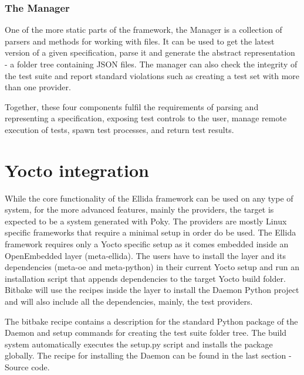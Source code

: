 \subsubsection*{The Manager}
One of the more static parts of the framework, the Manager is a collection of parsers and methods for working with files. It can be used to get the latest version of a given specification, parse it and generate the abstract representation - a folder tree containing JSON files. The manager can also check the integrity of the test suite and report standard violations such as creating a test set with more than one provider.

\vspace{7mm}

Together, these four components fulfil the requirements of parsing and representing a specification, exposing test controls to the user, manage remote execution of tests, spawn test processes, and return test results.

\section*{}

\section{Yocto integration}

While the core functionality of the Ellida framework can be used on any type of system, for the more advanced features, mainly the providers, the target is expected to be a system generated with Poky. The providers are mostly Linux specific frameworks that require a minimal setup in order do be used. The Ellida framework requires only a Yocto specific setup as it comes embedded inside an OpenEmbedded layer (meta-ellida). The users have to install the layer and its dependencies (meta-oe and meta-python) in their current Yocto setup and run an installation script that appends dependencies to the target Yocto build folder. Bitbake will use the recipes inside the layer to install the Daemon Python project and will also include all the dependencies, mainly, the test providers.

The bitbake recipe contains a description for the standard Python package of the Daemon and setup commands for creating the test suite folder tree. The build system automatically executes the setup.py script and installs the package globally. The recipe for installing the Daemon can be found in the last section - Source code.

